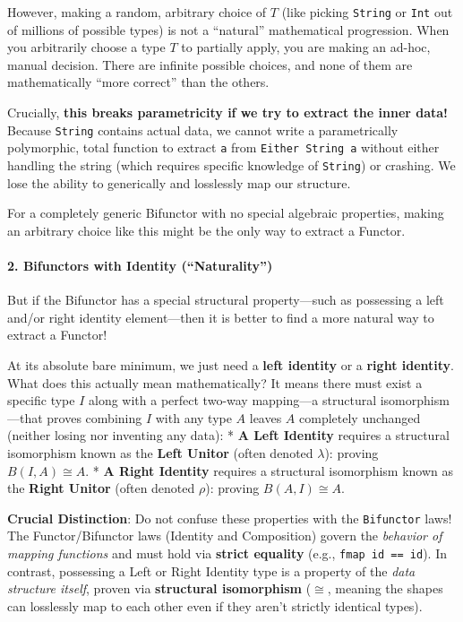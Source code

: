 \documentclass[
]{article}
\begin{document}
However, making a random, arbitrary choice of \(T\) (like picking
\texttt{String} or \texttt{Int} out of millions of possible types) is
not a ``natural'' mathematical progression. When you arbitrarily choose
a type \(T\) to partially apply, you are making an ad-hoc, manual
decision. There are infinite possible choices, and none of them are
mathematically ``more correct'' than the others.

Crucially, \textbf{this breaks parametricity if we try to extract the
inner data!} Because \texttt{String} contains actual data, we cannot
write a parametrically polymorphic, total function to extract \texttt{a}
from \texttt{Either\ String\ a} without either handling the string
(which requires specific knowledge of \texttt{String}) or crashing. We
lose the ability to generically and losslessly map our structure.

For a completely generic Bifunctor with no special algebraic properties,
making an arbitrary choice like this might be the only way to extract a
Functor.

\paragraph{2. Bifunctors with Identity
(``Naturality'')}\label{bifunctors-with-identity-naturality}

But if the Bifunctor has a special structural property---such as
possessing a left and/or right identity element---then it is better to
find a more natural way to extract a Functor!

At its absolute bare minimum, we just need a \textbf{left identity} or a
\textbf{right identity}. What does this actually mean mathematically? It
means there must exist a specific type \(I\) along with a perfect
two-way mapping---a structural isomorphism---that proves combining \(I\)
with any type \(A\) leaves \(A\) completely unchanged (neither losing
nor inventing any data): * \textbf{A Left Identity} requires a
structural isomorphism known as the \textbf{Left Unitor} (often denoted
\(\lambda\)): proving \(B(I, A) \cong A\). * \textbf{A Right Identity}
requires a structural isomorphism known as the \textbf{Right Unitor}
(often denoted \(\rho\)): proving \(B(A, I) \cong A\).

\textbf{Crucial Distinction}: Do not confuse these properties with the
\texttt{Bifunctor} laws! The Functor/Bifunctor laws (Identity and
Composition) govern the \emph{behavior of mapping functions} and must
hold via \textbf{strict equality} (e.g., \texttt{fmap\ id\ ==\ id}). In
contrast, possessing a Left or Right Identity type is a property of the
\emph{data structure itself}, proven via \textbf{structural isomorphism}
(\(\cong\), meaning the shapes can losslessly map to each other even if
they aren't strictly identical types).
\end{document}
